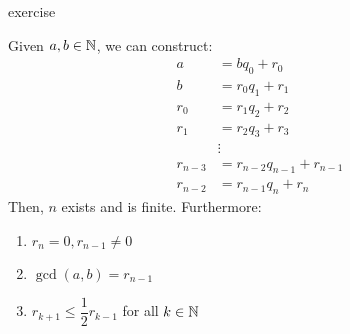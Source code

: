 \documentclass{article}
\begin{document}
\begin{pf}
exercise
\end{pf}

\begin{thm}
Given $ a, b \in \mathbb{N} $, we can construct:
\begin{align*}
    a & = bq_{0} + r_{0} \\
    b & = r_{0}q_{1} + r_{1} \\
    r_{0} & = r_{1}q_{2} + r_{2} \\
    r_{1} & = r_{2}q_{3} + r_{3} \\
          & \vdots \\
    r_{n-3} & = r_{n-2}q_{n-1} + r_{n-1} \\
    r_{n-2} & = r_{n-1}q_{n} + r_{n}
\end{align*}
Then, $ n $ exists and is finite. Furthermore:
\begin{enumerate}
    \item $ r_{n} = 0, r_{n-1} \neq 0 $
    \item $ \gcd(a, b) = r_{n-1} $
    \item $ r_{k+1} \leq \dfrac{1}{2}r_{k-1} $ for all $ k \in \mathbb{N} $
\end{enumerate}
\end{thm}
\end{document}
